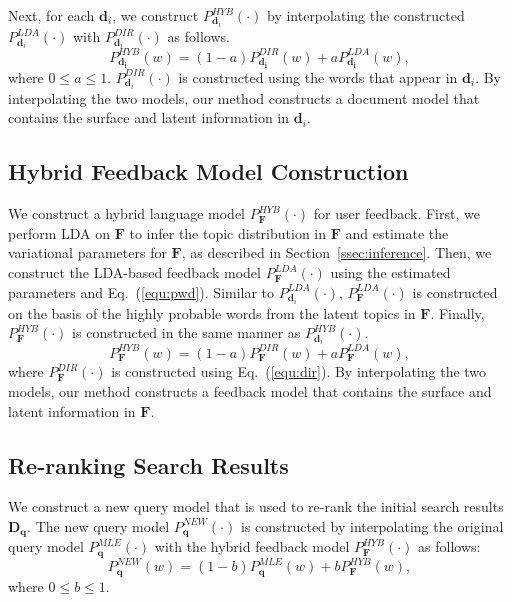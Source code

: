 \documentclass[english]{jnlp_1.4_rep}
\begin{document}
Next, for each $\bm{d}_{i}$, we construct $P^{HYB}_{\bm{d}_{i}}(\cdot)$
by interpolating the constructed $P_{\bm{d}_{i}}^{LDA}(\cdot)$ with
$P_{\bm{d}_{i}}^{DIR}(\cdot)$ as follows.
\begin{equation}
 P^{HYB}_{\bm{d_{i}}}(w)
 = (1 - a) P^{DIR}_{\bm{d_{i}}}(w) + a P^{LDA}_{\bm{d_{i}}}(w),
 \label{equ:hdm}
\end{equation}
where $0 \le a \le 1$. $P^{DIR}_{\bm{d}_{i}}(\cdot)$ is constructed
using the words that appear in $\bm{d}_{i}$. By interpolating the two
models, our method constructs a document model that contains the surface
and latent information in $\bm{d}_{i}$.


\subsection{Hybrid Feedback Model Construction}

We construct a hybrid language model $P^{HYB}_{\bm{F}}(\cdot)$ for user
feedback. First, we perform LDA on $\bm{F}$ to infer the topic
distribution in $\bm{F}$ and estimate the variational parameters for
$\bm{F}$, as described in Section~\ref{ssec:inference}. Then, we
construct the LDA-based feedback model $P^{LDA}_{\bm{F}}(\cdot)$ using
the estimated parameters and Eq.~(\ref{equ:pwd}). Similar to
$P^{LDA}_{\bm{d}_{i}}(\cdot)$, $P^{LDA}_{\bm{F}}(\cdot)$ is constructed
on the basis of the highly probable words from the latent topics in
$\bm{F}$. Finally, $P^{HYB}_{\bm{F}}(\cdot)$ is constructed in the same
manner as $P^{HYB}_{\bm{d}_{i}}(\cdot)$.
\begin{equation}
 P^{HYB}_{\bm{F}}(w)
 = (1 - a) P^{DIR}_{\bm{F}}(w) + a P^{LDA}_{\bm{F}}(w),
 \label{equ:hfm}
\end{equation}
where $P^{DIR}_{\bm{F}}(\cdot)$ is constructed using
Eq.~(\ref{equ:dir}). By interpolating the two models, our method
constructs a feedback model that contains the surface and latent
information in $\bm{F}$.


\subsection{Re-ranking Search Results}

We construct a new query model that is used to re-rank the initial
search results $\bm{D}_{\bm{q}}$. The new query model
$P^{NEW}_{\bm{q}}(\cdot)$ is constructed by interpolating the original
query model $P^{MLE}_{\bm{q}}(\cdot)$ with the hybrid feedback model
$P^{HYB}_{\bm{F}}(\cdot)$ as follows:
\begin{equation}
 P^{NEW}_{\bm{q}}(w)
 = (1 - b) P^{MLE}_{\bm{q}}(w) + b P^{HYB}_{\bm{F}}(w),
 \label{equ:nqm}
\end{equation}
where $0 \le b \le 1$.
\end{document}
